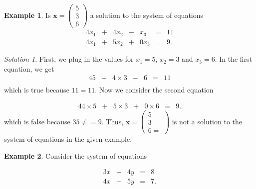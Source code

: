 \documentclass[
]{book}
\theoremstyle{definition}
\theoremstyle{definition}
\newtheorem{example}{Example}[chapter]
\theoremstyle{definition}
\theoremstyle{definition}
\theoremstyle{remark}
\newtheorem*{solution}{Solution}
\begin{document}
\begin{example}
Is \(\mathbf{x} = \begin{pmatrix} 5 \\ 3 \\ 6 \end{pmatrix}\) a solution to the system of equations
\begin{alignat*}{4}
x_1   & {}+{} & 4 x_2 & {}-{} & x_3 & {}={} & 11 \\
4 x_1 & {}+{} & 5 x_2 & {}+{} & 0 x_3 & {}={} & 9.
\end{alignat*}
\end{example}

\begin{solution}
First, we plug in the values for \(x_1 = 5\), \(x_2 = 3\) and \(x_3 = 6\). In the first equation, we get
\begin{alignat*}{4}
5   & {}+{} & 4 \times 3 & {}-{} & 6 & {}={} & 11 \\
\end{alignat*}
which is true because \(11 = 11\). Now we consider the second equation

\begin{alignat*}{4}
4 \times 5 & {}+{} & 5 \times 3 & {}+{} & 0 \times 6 & {}={} & 9.
\end{alignat*}
which is false because \(35 \neq = 9\). Thus, \(\mathbf{x} = \begin{pmatrix} 5 \\ 3 \\ 6 = \end{pmatrix}\) is not a solution to the system of equations in the given example.
\end{solution}

\begin{example}
Consider the system of equations

\begin{alignat*}{3}
x   & {}+{} & 4 y & {}={} & 8 \\
4 x & {}+{} & 5 y & {}={} & 7.
\end{alignat*}
\end{example}
\end{document}
